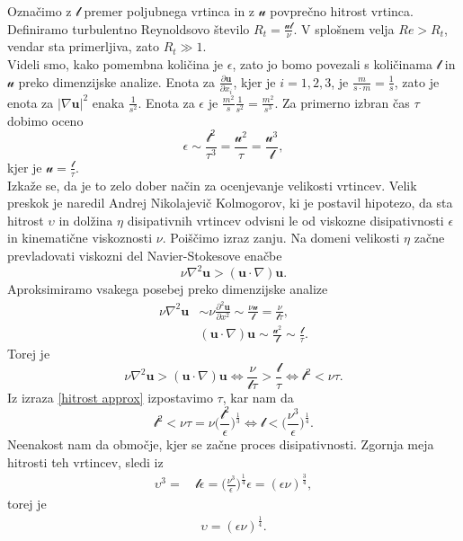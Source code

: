 \documentclass[mat2, tisk]{fmfdelo}
\newcommand{\bd}{\textbf}
\begin{document}
Označimo z $\mathscr{l}$ premer poljubnega vrtinca in z $\mathscr{u}$ povprečno hitrost vrtinca.
Definiramo turbulentno Reynoldsovo število $R_t = \frac{\mathscr{u}\mathscr{l}}{\nu}$. 
V splošnem velja $Re > R_t$, vendar sta primerljiva, zato $R_t \gg 1$. \\
Videli smo, kako pomembna količina je $\epsilon$, zato jo bomo povezali s količinama 
$\mathscr{l}$ in $\mathscr{u}$ preko dimenzijske analize. Enota za $\frac{\partial \bd{u}}{\partial x_i}$,
kjer je $i=1,2,3$, je $\frac{m}{s\cdot m} = \frac{1}{s}$, zato je enota za $|\nabla \bd{u}|^2$ enaka $\frac{1}{s^2}$.
Enota za $\epsilon$ je $\frac{m^2}{s} \frac{1}{s^2} = \frac{m^2}{s^3}$.
Za primerno izbran čas $\tau$ dobimo oceno
\begin{equation}
\label{hitrost approx}
\epsilon \sim \frac{\mathscr{l}^2}{\tau^3} = \frac{\mathscr{u}^2}{\tau} = \frac{\mathscr{u^3}}{\mathscr{l}},
\end{equation}
kjer je $\mathscr{u} = \frac{\mathscr{l}}{\tau}$.\\
Izkaže se, da je to zelo dober način za ocenjevanje velikosti vrtincev. Velik preskok je 
naredil Andrej Nikolajevič Kolmogorov, ki je postavil hipotezo, da sta hitrost $\upsilon$ 
in dolžina $\eta$ disipativnih vrtincev odvisni le od viskozne disipativnosti $\epsilon$ 
in kinematične viskoznosti $\nu$. Poiščimo izraz zanju.
Na domeni velikosti $\eta$ začne prevladovati viskozni del Navier-Stokesove enačbe 
$$
\nu \nabla^2 \bd{u} > (\bd{u}\cdot \nabla)\bd{u}.
$$
Aproksimiramo vsakega posebej preko dimenzijske analize
\begin{align*}
\nu \nabla^2 \bd{u} &\sim \nu \frac{\partial^2 \bd{u}}{\partial x^2} \sim \frac{\nu \mathscr{u}}{\mathscr{l}} = \frac{\nu}{\mathscr{l}\tau}, \\[2mm]
&(\bd{u}\cdot \nabla)\bd{u} \sim \frac{\mathscr{u}^2}{\mathscr{l}} \sim \frac{\mathscr{l}}{\tau}.
\end{align*}
Torej je
$$      
\nu \nabla^2 \bd{u} > (\bd{u}\cdot \nabla)\bd{u} \iff \frac{\nu}{\mathscr{l}\tau} > \frac{\mathscr{l}}{\tau} \iff \mathscr{l}^2 < \nu \tau.
$$
Iz izraza \eqref{hitrost approx} izpostavimo $\tau$, kar nam da
$$
\mathscr{l}^2 < \nu \tau = \nu \Big(\frac{\mathscr{l}^2}{\epsilon} \Big)^\frac{1}{3} \iff \mathscr{l} < \Big(\frac{\nu^3}{\epsilon} \Big)^\frac{1}{4}.
$$
Neenakost nam da območje, kjer se začne proces disipativnosti. 
Zgornja meja hitrosti teh vrtincev, sledi iz
\begin{align*}
\upsilon^3 =& \,\mathscr{l}\epsilon = \Big(\frac{\nu^3}{\epsilon}\Big)^\frac{1}{4} \epsilon = (\epsilon \nu)^\frac{3}{4},
\end{align*}
torej je
\begin{align*}
\upsilon = (\epsilon \nu)^\frac{1}{4}.
\end{align*}
\end{document}
